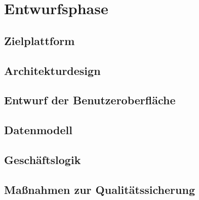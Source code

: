 \newpage
\section{Entwurfsphase}
\label{entwurfsphase}

\subsection{Zielplattform}
\label{zielplattform}

\subsection{Architekturdesign}
\label{architekturdesign}

\subsection{Entwurf der Benutzeroberfläche}
\label{benutzeroberfläche}

\subsection{Datenmodell}
\label{datenmodell}

\subsection{Geschäftslogik}
\label{geschaeftslogik}

\subsection{Maßnahmen zur Qualitätssicherung}
\label{qualitaetssicherung}
